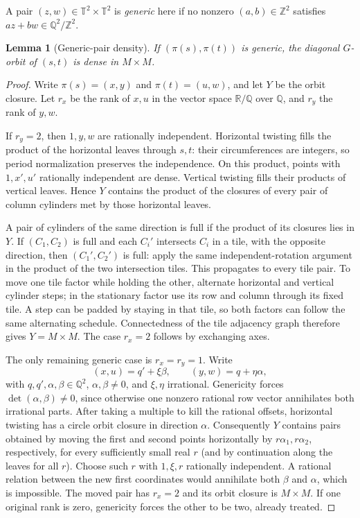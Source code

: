 \documentclass[11pt]{article}
\newtheorem{lemma}{Lemma}
\theoremstyle{remark}
\newcommand{\T}{\mathbb T}
\newcommand{\Q}{\mathbb Q}
\newcommand{\Z}{\mathbb Z}
\newcommand{\R}{\mathbb R}
\begin{document}
A pair $(z,w)\in\T^2\times\T^2$ is \emph{generic} here if no nonzero
$(a,b)\in\Z^2$ satisfies $az+bw\in\Q^2/\Z^2$.

\begin{lemma}[Generic-pair density]\label{lem:generic}
If $(\pi(s),\pi(t))$ is generic, the diagonal $G$-orbit of $(s,t)$ is dense
in $M\times M$.
\end{lemma}
\begin{proof}
Write $\pi(s)=(x,y)$ and $\pi(t)=(u,w)$, and let $Y$ be the orbit closure.
Let $r_x$ be the rank of $x,u$ in the vector space $\R/\Q$ over $\Q$,
and $r_y$ the rank of $y,w$.

If $r_y=2$, then $1,y,w$ are rationally independent. Horizontal twisting
fills the product of the horizontal leaves through $s,t$: their
circumferences are integers, so period normalization preserves the
independence. On this product, points with $1,x',u'$ rationally independent
are dense. Vertical twisting fills their products of vertical leaves.
Hence $Y$ contains the product of the closures of every pair of column
cylinders met by those horizontal leaves.

A pair of cylinders of the same direction is full if the product of its
closures lies in $Y$. If $(C_1,C_2)$ is full and each $C_i'$ intersects
$C_i$ in a tile, with the opposite direction, then $(C_1',C_2')$ is full:
apply the same independent-rotation argument in the product of the two
intersection tiles. This propagates to every tile pair. To move one tile
factor while holding the other, alternate horizontal and vertical cylinder
steps; in the stationary factor use its row and column through its fixed
tile. A step can be padded by staying in that tile, so both factors can
follow the same alternating schedule. Connectedness of the tile adjacency
graph therefore gives $Y=M\times M$.
The case $r_x=2$ follows by exchanging axes.

The only remaining generic case is $r_x=r_y=1$. Write
\[
 (x,u)=q'+\xi\beta,\qquad (y,w)=q+\eta\alpha,
\]
with $q,q',\alpha,\beta\in\Q^2$, $\alpha,\beta\ne0$, and $\xi,\eta$
irrational. Genericity forces $\det(\alpha,\beta)\ne0$, since otherwise
one nonzero rational row vector annihilates both irrational parts.
After taking a multiple to kill the rational offsets, horizontal twisting
has a circle orbit closure in direction $\alpha$. Consequently $Y$
contains pairs obtained by moving the first and second points horizontally
by $r\alpha_1,r\alpha_2$, respectively, for every sufficiently small real
$r$ (and by continuation along the leaves for all $r$).
Choose such $r$ with $1,\xi,r$ rationally independent. A rational relation
between the new first coordinates would annihilate both $\beta$ and
$\alpha$, which is impossible. The moved pair has $r_x=2$ and its orbit
closure is $M\times M$. If one original rank is zero, genericity forces
the other to be two, already treated.
\end{proof}
\end{document}
